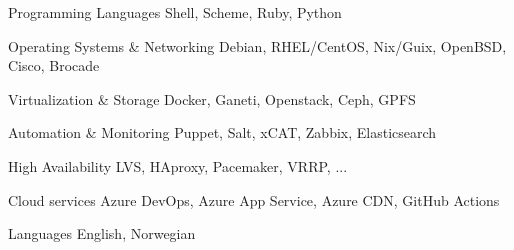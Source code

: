 

\begin{cvskills}

  \cvskill
    {Programming Languages} %
    {Shell, Scheme, Ruby, Python} %

  \cvskill
    {Operating Systems \& Networking} %
    {Debian, RHEL/CentOS, Nix/Guix, OpenBSD, Cisco, Brocade} %

  \cvskill
    {Virtualization \& Storage} %
    {Docker, Ganeti, Openstack, Ceph, GPFS} %

  \cvskill
    {Automation \& Monitoring} %
    {Puppet, Salt, xCAT, Zabbix, Elasticsearch} %

  \cvskill
    {High Availability} %
    {LVS, HAproxy, Pacemaker, VRRP, ...} %

  \cvskill
    {Cloud services} %
    {Azure DevOps, Azure App Service, Azure CDN, GitHub Actions} %

  \cvskill
    {Languages} %
    {English, Norwegian} %

\end{cvskills}

